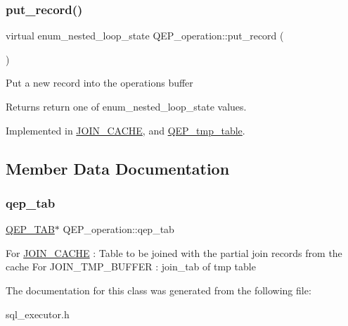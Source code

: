 \mbox{\label{classQEP__operation_af7cac289b2b1a38349cc27e8a4ff7597}} 
\subsubsection{\texorpdfstring{put\+\_\+record()}{put\_record()}}
{\footnotesize\ttfamily virtual enum\+\_\+nested\+\_\+loop\+\_\+state Q\+E\+P\+\_\+operation\+::put\+\_\+record (\begin{DoxyParamCaption}{ }\end{DoxyParamCaption})\hspace{0.3cm}{\ttfamily [pure virtual]}}

Put a new record into the operation\textquotesingle{}s buffer \begin{DoxyReturn}{Returns}
return one of enum\+\_\+nested\+\_\+loop\+\_\+state values. 
\end{DoxyReturn}


Implemented in \mbox{\hyperlink{classJOIN__CACHE_a28c138049387c559d0ea74d7a6fbcfc0}{J\+O\+I\+N\+\_\+\+C\+A\+C\+HE}}, and \mbox{\hyperlink{classQEP__tmp__table_ad402039d362a460ab3b4f7035cd843ce}{Q\+E\+P\+\_\+tmp\+\_\+table}}.



\subsection{Member Data Documentation}
\mbox{\label{classQEP__operation_aed9c7ecad9e27f9d3d73062a4890534a}} 
\subsubsection{\texorpdfstring{qep\+\_\+tab}{qep\_tab}}
{\footnotesize\ttfamily \mbox{\hyperlink{classQEP__TAB}{Q\+E\+P\+\_\+\+T\+AB}}$\ast$ Q\+E\+P\+\_\+operation\+::qep\+\_\+tab}

For \mbox{\hyperlink{classJOIN__CACHE}{J\+O\+I\+N\+\_\+\+C\+A\+C\+HE}} \+: Table to be joined with the partial join records from the cache For J\+O\+I\+N\+\_\+\+T\+M\+P\+\_\+\+B\+U\+F\+F\+ER \+: join\+\_\+tab of tmp table 

The documentation for this class was generated from the following file\+:\begin{DoxyCompactItemize}
\item 
sql\+\_\+executor.\+h\end{DoxyCompactItemize}
